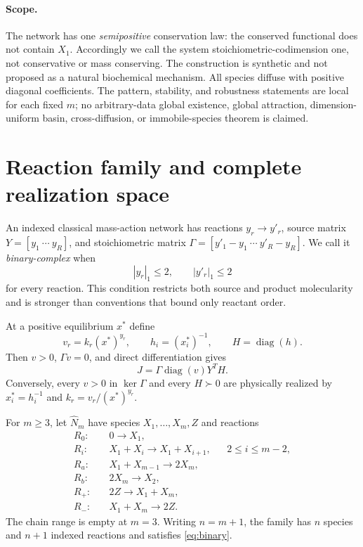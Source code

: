\documentclass[11pt]{article}
\theoremstyle{definition}
\newcommand{\diag}{\operatorname{diag}}
\newcommand{\1}{\mathbf 1}
\begin{document}
\paragraph{Scope.}
The network has one \emph{semipositive} conservation law: the conserved
functional does not contain $X_1$.  Accordingly we call the system
stoichiometric-codimension one, not conservative or mass conserving.  The
construction is synthetic and not proposed as a natural biochemical
mechanism.  All species diffuse with positive diagonal coefficients.  The
pattern, stability, and robustness statements are local for each fixed
$m$; no arbitrary-data global existence, global attraction, dimension-uniform
basin, cross-diffusion, or immobile-species theorem is claimed.

\section{Reaction family and complete realization space}

An indexed classical mass-action network has reactions $y_r\to y'_r$, source
matrix $Y=[y_1\ \cdots\ y_R]$, and stoichiometric matrix
$\Gamma=[y'_1-y_1\ \cdots\ y'_R-y_R]$.  We call it
\emph{binary-complex} when
\begin{equation}\label{eq:binary}
 |y_r|_1\le2,\qquad |y'_r|_1\le2
\end{equation}
for every reaction.  This condition restricts both source and product
molecularity and is stronger than conventions that bound only reactant order.

At a positive equilibrium $x^*$ define
\begin{equation}\label{eq:flux-h}
 v_r=k_r(x^*)^{y_r},\qquad h_i=(x_i^*)^{-1},\qquad H=\diag(h).
\end{equation}
Then $v>0$, $\Gamma v=0$, and direct differentiation gives
\begin{equation}\label{eq:jac-factor}
 J=\Gamma\diag(v)Y^TH.
\end{equation}
Conversely, every $v>0$ in $\ker\Gamma$ and every $H\succ0$ are physically
realized by $x_i^*=h_i^{-1}$ and $k_r=v_r/(x^*)^{y_r}$.

For $m\ge3$, let $\widehat N_m$ have species $X_1,\ldots,X_m,Z$ and reactions
\begin{align}
R_0:&\quad 0\longrightarrow X_1,\label{rxn:r0}\\
R_i:&\quad X_1+X_i\longrightarrow X_1+X_{i+1},
&&2\le i\le m-2,\label{rxn:chain}\\
R_a:&\quad X_1+X_{m-1}\longrightarrow2X_m,\label{rxn:terminal}\\
R_b:&\quad 2X_m\longrightarrow X_2,\label{rxn:return}\\
R_+:&\quad 2Z\longrightarrow X_1+X_m,\label{rxn:plus}\\
R_-:&\quad X_1+X_m\longrightarrow2Z.\label{rxn:minus}
\end{align}
The chain range is empty at $m=3$.  Writing $n=m+1$, the family has $n$
species and $n+1$ indexed reactions and satisfies \eqref{eq:binary}.
\end{document}
